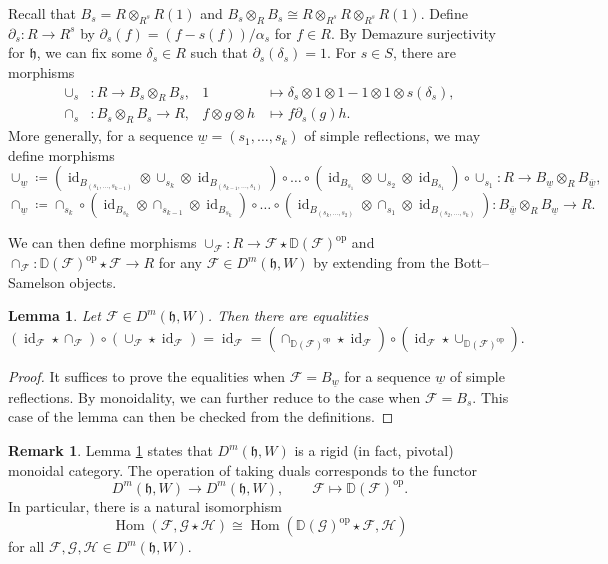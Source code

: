 \documentclass{amsart}
\newcommand{\scrF}{\mathcal{F}}
\newcommand{\scrG}{\mathcal{G}}
\newcommand{\scrH}{\mathcal{H}}
\newcommand{\uw}{\underline{w}}
\DeclareMathOperator{\Hom}{Hom}
\newcommand{\BE}{D^m}
\newcommand{\fr}[1]{\mathfrak{#1}}
\DeclareMathOperator{\op}{op}
\DeclareMathOperator{\id}{id}
\newcommand{\DD}{\mathbb{D}}
\newtheorem{lemma}{Lemma}[section]
\theoremstyle{definition}
\newtheorem{remark}{Remark}[section]
\begin{document}
        Recall that $B_s = R \otimes_{R^s} R (1)$ and $B_s \otimes_R B_s \cong R \otimes_{R^s} R \otimes_{R^s} R (1)$.
        Define $\partial_s : R \to R^s$ by $\partial_s (f) = (f-s(f))/\alpha_s$ for $f \in R$. By Demazure surjectivity for $\fr{h}$, we can fix some $\delta_s \in R$ such that $\partial_s (\delta_s) = 1$.
        For $s \in S$, there are morphisms
        \begin{align*}
                \cup_s &: R \to B_s \otimes_R B_s, &  1 &\mapsto \delta_s \otimes 1 \otimes 1 - 1 \otimes 1 \otimes s(\delta_s), \\
                \cap_s &: B_s \otimes_R B_s \to R, &  f \otimes g \otimes h &\mapsto f \partial_s (g) h.
        \end{align*}
        More generally, for a sequence $\uw = (s_1, \ldots, s_k)$ of simple reflections, we may define morphisms
        \[\cup_{\uw} \coloneq (\id_{B_{(s_1, \ldots, s_{k-1})}} \otimes \cup_{s_k} \otimes \id_{B_{(s_{k-1}, \ldots ,s_1)}}) \circ \ldots \circ (\id_{B_{s_1}} \otimes \cup_{s_2} \otimes \id_{B_{s_1}}) \circ \cup_{s_1} : R \to B_{\uw} \otimes_R B_{\overline{\uw}},\]
        \[\cap_{\uw} \coloneq \cap_{s_k} \circ (\id_{B_{s_k}} \otimes \cap_{s_{k-1}} \otimes \id_{B_{s_k}}) \circ \ldots \circ (\id_{B_{(s_k, \ldots, s_{2})}} \otimes \cap_{s_1} \otimes \id_{B_{(s_{2}, \ldots, s_{k})}}) : B_{\overline{\uw}} \otimes_R B_{\uw} \to R. \]

        We can then define morphisms $\cup_{\scrF} : R \to \scrF \star \DD (\scrF)^{\op}$ and $\cap_{\scrF} : \DD(\scrF)^{\op} \star \scrF \to R$ for any $\scrF \in \BE (\fr{h}, W)$ by extending from the Bott--Samelson objects.
        
        \begin{lemma}\label{lem:duals}
                Let $\scrF \in \BE (\fr{h}, W)$. Then there are equalities
                \[(\id_{\scrF} \star \cap_{\scrF}) \circ (\cup_{\scrF} \star \id_{\scrF}) = \id_{\scrF} = (\cap_{\DD(\scrF)^{\op}} \star \id_{\scrF}) \circ (\id_{\scrF} \star \cup_{\DD(\scrF)^{\op} }).\]
        \end{lemma}
        \begin{proof}
                It suffices to prove the equalities when $\scrF = B_{\uw}$ for a sequence $\uw$ of simple reflections. By monoidality, we can further reduce to the case when $\scrF = B_s$.
                This case of the lemma can then be checked from the definitions.
        \end{proof}

        \begin{remark}
                Lemma \ref{lem:duals} states that $\BE (\fr{h}, W)$ is a rigid (in fact, pivotal) monoidal category. The operation of taking duals corresponds to the functor
                \[\BE (\fr{h}, W) \to \BE (\fr{h}, W), \qquad \scrF \mapsto \DD (\scrF)^{\op}.\]
                In particular, there is a natural isomorphism
                \[\Hom (\scrF, \scrG \star \scrH) \cong \Hom (\DD (\scrG)^{\op} \star \scrF, \scrH)\]
                for all $\scrF, \scrG, \scrH \in \BE (\fr{h}, W)$.
        \end{remark}
\end{document}
